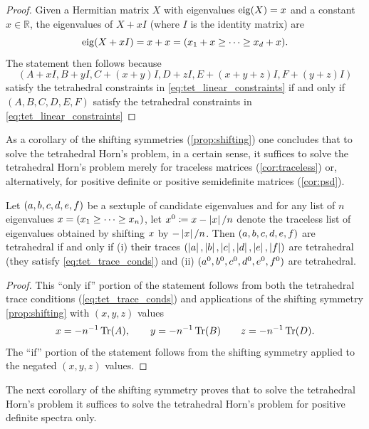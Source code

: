 \documentclass[notitlepage, 10pt]{article}
\begin{document}
\begin{proof}
    Given a Hermitian matrix $X$ with eigenvalues $\operatorname{eig}(X) = x$ and a constant $x \in \mathbb R$, the eigenvalues of $X+xI$ (where $I$ is the identity matrix) are
    \begin{equation}
        \operatorname{eig}(X+xI) = x + x = (x_1 + x \geq \cdots \geq x_d + x).
    \end{equation}
    The statement then follows because
    \begin{equation}
        (A+xI,B+yI,C+(x+y)I,D+zI, E+(x+y+z)I, F+(y+z)I)
    \end{equation}
    satisfy the tetrahedral constraints in \cref{eq:tet_linear_constraints} if and only if $(A,B,C,D,E,F)$ satisfy the tetrahedral constraints in \cref{eq:tet_linear_constraints}
\end{proof}
As a corollary of the shifting symmetries (\cref{prop:shifting}) one concludes that to solve the tetrahedral Horn's problem, in a certain sense, it suffices to solve the tetrahedral Horn's problem merely for traceless matrices (\cref{cor:traceless}) or, alternatively, for positive definite or positive semidefinite matrices (\cref{cor:psd}).
\begin{cor}
    \label{cor:traceless}
    Let $(a, b, c, d, e, f)$ be a sextuple of candidate eigenvalues and for any list of $n$ eigenvalues $x = (x_1 \geq \cdots \geq x_n)$, let $x^{0} \coloneqq x - \left|x\right|/n$ denote the traceless list of eigenvalues obtained by shifting $x$ by $-\left|x\right|/n$.
    Then $(a, b, c, d, e, f)$ are tetrahedral if and only if (i) their traces $(\left|a\right|, \left|b\right|, \left|c\right|, \left|d\right|, \left|e\right|, \left|f\right|)$ are tetrahedral (they satisfy \cref{eq:tet_trace_conds}) and (ii) $(a^0, b^0, c^0, d^0, e^0, f^0)$ are tetrahedral.
\end{cor}
\begin{proof}
    This ``only if'' portion of the statement follows from both the tetrahedral trace conditions (\cref{eq:tet_trace_conds}) and applications of the shifting symmetry \cref{prop:shifting} with $(x,y,z)$ values
    \begin{equation}
        x = - n^{-1}\operatorname{Tr}(A), \qquad
        y = - n^{-1}\operatorname{Tr}(B) \qquad
        z = - n^{-1}\operatorname{Tr}(D).
    \end{equation}
    The ``if'' portion of the statement follows from the shifting symmetry applied to the negated $(x,y,z)$ values.
\end{proof}
The next corollary of the shifting symmetry proves that to solve the tetrahedral Horn's problem it suffices to solve the tetrahedral Horn's problem for positive definite spectra only.
\end{document}
